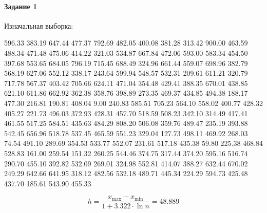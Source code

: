 \paragraph{Задание 1}

Изначальная выборка:

596.33 383.19 647.44 477.37 792.69 482.05 400.08
381.28 313.42 900.00 463.59 488.34 471.48 475.06
414.22 321.03 534.87 667.84 472.06 593.00 583.34
454.50 397.68 553.65 684.05 796.19 715.45 688.49
324.96 661.44 559.07 698.96 382.79 568.19 627.06
552.12 338.17 243.64 599.94 548.57 532.31 209.61
611.21 320.79 717.78 567.37 403.42 705.66 624.11
471.04 354.48 429.41 388.35 670.01 438.85 621.10
611.86 662.92 362.38 358.76 398.89 273.35 469.37
434.85 494.38 188.17 477.30 216.81 190.81 408.04
9.00 240.83 585.51 705.23 564.10 558.02 400.77
428.32 405.27 221.73 496.03 372.93 428.31 457.70
518.59 508.23 342.10 314.49 417.41 461.55 517.25
584.51 435.63 484.29 808.20 506.08 359.76 489.47
235.19 393.88 542.45 656.96 518.78 537.45 465.59
551.23 329.04 127.73 498.11 469.92 268.03 74.54
491.10 289.69 354.53 533.77 552.07 231.61 517.18
435.38 59.80 225.38 468.84 528.83 161.00 259.54
151.32 260.25 544.46 374.75 317.44 374.20 595.16
516.74 290.70 455.10 392.82 532.09 269.01 324.98
552.81 414.07 388.27 632.44 670.02 249.29 642.66
641.95 318.12 482.56 532.18 489.71 445.34 224.29
594.73 425.48 437.70 185.61 543.90 455.33

\[h = \frac{x_{\max} - x_{\min}}{1 + 3.322\cdot\ln{n}} = 48.889\]

